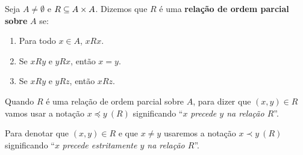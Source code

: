\begin{definicao}
	Seja $A \ne \emptyset$ e $R \subseteq A \times A$. Dizemos que $R$ é uma \textbf{relação de ordem parcial sobre} $A$ se:
	\begin{enumerate}
		\item Para todo $x \in A$, $xRx$.
		\item Se $xRy$ e $yRx$, então $x = y$.
		\item Se $xRy$ e $yRz$, então $xRz$.
	\end{enumerate}
\end{definicao}

Quando $R$ é uma relação de ordem parcial sobre $A$, para dizer que $(x,y) \in R$ vamos usar a notação $x\preceq y\ (R)$ significando ``$x$ \textit{precede $y$ na relação $R$}''.

Para denotar que $(x,y) \in R$ e que $x \ne y$ usaremos a notação $x \prec y\ (R)$ significando ``$x$ \textit{precede estritamente $y$ na relação $R$}''.


